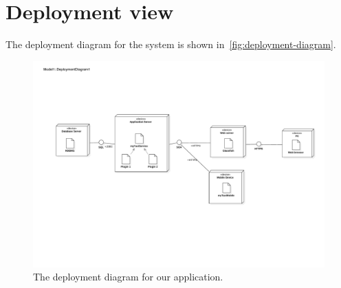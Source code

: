 \section{Deployment view}
\label{sec:deployment-view}

The deployment diagram for the system is shown in~\autoref{fig:deployment-diagram}.
\begin{figure}[h]
\centering
\includegraphics[width=\textwidth]{diagrams/deployment_diagram}
\caption{The deployment diagram for our application.}
\label{fig:deployment-diagram}
\end{figure}
